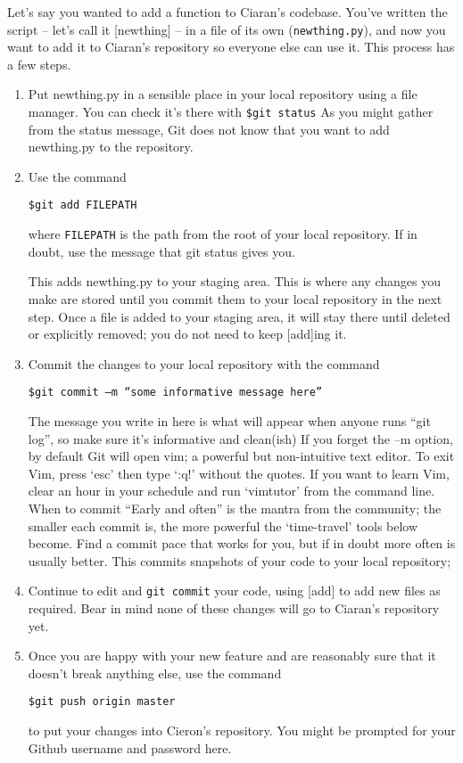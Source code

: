 \documentclass[11pt, a4paper, english]{article}
\newenvironment{wrapbox}[1][r]
	{\wrapfigure{#1}{0.35\textwidth}\tcolorbox}
	{\endtcolorbox\endwrapfigure}
\begin{document}
Let’s say you wanted to add a function to Ciaran’s codebase. You’ve written the script – let’s call it [newthing] – in a file of its own (\verb|newthing.py|), and now you want to add it to Ciaran’s repository so everyone else can use it. This process has a few steps.

\begin{enumerate}
\item Put newthing.py in a sensible place in your local repository using a file manager. You can check it’s there with \verb|$git status|
As you might gather from the status message, Git does not know that you want to add newthing.py to the repository.
\item Use the command
\begin{verbatim}
$git add FILEPATH
\end{verbatim}
where \verb|FILEPATH| is the path from the root of your local repository. If in doubt, use the message that git status gives you.

This adds newthing.py to your staging area. This is where any changes you make are stored until you commit them to your local repository in the next step. Once a file is added to your staging area, it will stay there until deleted or explicitly removed; you do not need to keep [add]ing it.

\item Commit the changes to your local repository with the command
\begin{verbatim}
$git commit –m “some informative message here”
\end{verbatim}
The message you write in here is what will appear when anyone runs “git log”, so make sure it’s informative and clean(ish)
\begin{wrapbox} 
If you forget the –m option, by default Git will open vim; a powerful but non-intuitive text editor. To exit Vim, press ‘esc’ then type ‘:q!’ without the quotes. If you want to learn Vim, clear an hour in your schedule and run ‘vimtutor’ from the command line.
\end{wrapbox}
\begin{wrapbox} When to commit “Early and often” is the mantra from the community; the smaller each commit is, the more powerful the ‘time-travel’ tools below become. Find a commit pace that works for you, but if in doubt more often is usually better.
\end{wrapbox}
This commits snapshots of your code to your local repository; 
\item Continue to edit and \verb|git commit| your code, using [add] to add new files as required. Bear in mind none of these changes will go to Ciaran’s repository yet.
\item Once you are happy with your new feature and are reasonably sure that it doesn’t break anything else, use the command
\begin{verbatim}
$git push origin master
\end{verbatim}
to put your changes into Cieron’s repository. You might be prompted for your Github username and password here.
\end{enumerate}
\end{document}
